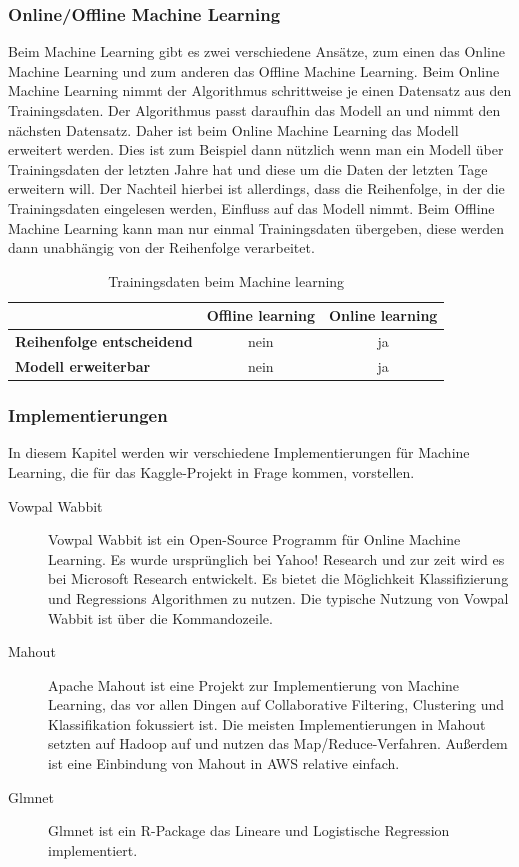\subsubsection{Online/Offline Machine Learning}

Beim Machine Learning gibt es zwei verschiedene Ansätze, zum einen das Online Machine Learning und zum anderen das Offline Machine Learning. Beim Online Machine Learning nimmt der Algorithmus schrittweise je einen Datensatz aus den Trainingsdaten. Der Algorithmus passt daraufhin das Modell an und nimmt den nächsten Datensatz. Daher ist beim Online Machine Learning das Modell erweitert werden. Dies ist zum Beispiel dann nützlich wenn man ein Modell über Trainingsdaten der letzten Jahre hat und diese um die Daten der letzten Tage erweitern will. Der Nachteil hierbei ist allerdings, dass die Reihenfolge, in der die Trainingsdaten eingelesen werden, Einfluss auf das Modell nimmt. Beim Offline Machine Learning kann man nur einmal Trainingsdaten übergeben, diese werden dann unabhängig von der Reihenfolge verarbeitet.

\begin{table}[H]
	\centering
\begin{tabular}{l|c|c} 
	\textbf{} & \textbf{Offline learning} & \textbf{Online learning}  \\  
	\hline \textbf{Reihenfolge entscheidend} & nein & ja \\
	\hline \textbf{Modell erweiterbar} & nein & ja 
	\vspace{0.3cm} 
\end{tabular} 
\caption{Trainingsdaten beim Machine learning}
\label{tab:MachineLearningTrainingData}
\end{table}
 
\subsubsection{Implementierungen}
In diesem Kapitel werden wir verschiedene Implementierungen für Machine Learning, die für das Kaggle-Projekt in Frage kommen, vorstellen.

\begin{description}
\item[Vowpal Wabbit] Vowpal Wabbit ist ein Open-Source Programm für Online Machine Learning. Es wurde ursprünglich bei Yahoo! Research und zur zeit wird es bei Microsoft Research entwickelt. Es bietet die Möglichkeit Klassifizierung und Regressions Algorithmen zu nutzen. Die typische Nutzung von Vowpal Wabbit ist über die Kommandozeile.

\item[Mahout] Apache Mahout ist eine Projekt zur Implementierung von Machine Learning, das vor allen Dingen auf Collaborative Filtering, Clustering und Klassifikation fokussiert ist. Die meisten Implementierungen in Mahout setzten auf Hadoop auf und nutzen das Map/Reduce-Verfahren. Außerdem ist eine Einbindung von Mahout in AWS relative einfach.

\item[Glmnet] Glmnet ist ein R-Package das Lineare und Logistische Regression implementiert.

\end{description}

